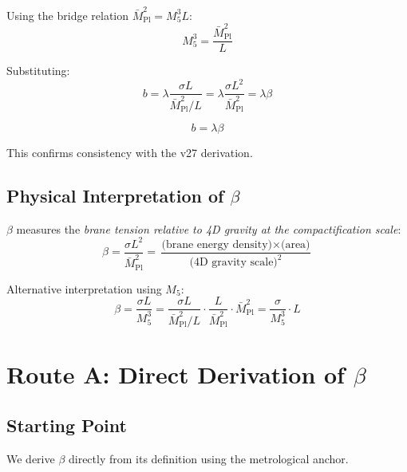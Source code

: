\documentclass[11pt,a4paper]{article}
\newcommand{\Mpl}{\bar{M}_{\mathrm{Pl}}}
\newcommand{\Mfive}{M_5}
\theoremstyle{definition}
\theoremstyle{plain}
\theoremstyle{remark}
\begin{document}
Using the bridge relation $\Mpl^2 = \Mfive^3 L$:
\begin{equation}
\Mfive^3 = \frac{\Mpl^2}{L}
\label{eq:M5-from-bridge}
\end{equation}

Substituting:
\begin{equation}
b = \lambda \frac{\sigma L}{\Mpl^2/L} = \lambda \frac{\sigma L^2}{\Mpl^2} = \lambda \beta
\label{eq:b-lambda-beta}
\end{equation}

\begin{equation}
\boxed{b = \lambda \beta}
\label{eq:b-lambda-beta-boxed}
\end{equation}

This confirms consistency with the v27 derivation.

\subsection{Physical Interpretation of $\beta$}

$\beta$ measures the \emph{brane tension relative to 4D gravity at the compactification scale}:
\begin{equation}
\beta = \frac{\sigma L^2}{\Mpl^2} = \frac{\text{(brane energy density)} \times \text{(area)}}{\text{(4D gravity scale)}^2}
\label{eq:beta-interpretation}
\end{equation}

Alternative interpretation using $\Mfive$:
\begin{equation}
\beta = \frac{\sigma L}{\Mfive^3} = \frac{\sigma L}{\Mpl^2/L} \cdot \frac{L}{\Mpl^2} \cdot \Mpl^2 = \frac{\sigma}{\Mfive^3} \cdot L
\label{eq:beta-M5-interpretation}
\end{equation}

\section{Route A: Direct Derivation of $\beta$}
\label{sec:route-a}

\subsection{Starting Point}

We derive $\beta$ directly from its definition using the metrological anchor.
\end{document}
